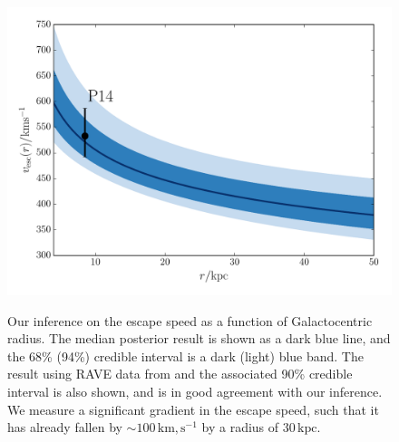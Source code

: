 \documentclass[useAMS,twocolumn,usenatbib]{mn2e}
\def\kpc{{\,\mathrm{kpc}}}
\def\km,s{{\,\mathrm{km,s^{-1}}}}
\begin{document}
\begin{figure}
\includegraphics[width=\columnwidth]{plots/vesc_posterior}\\
\caption{Our inference on the escape speed as a function of Galactocentric radius. 
The median posterior result is shown as a {} dark blue line, and the 68\% (94\%) credible interval is a dark (light) blue band. 
The result using RAVE data from \citet{Pi14} and the associated 90\% credible interval is also shown, and is in good agreement with our inference. 
We measure a significant gradient in the escape speed, such that it has already fallen by $\sim 100\km,s$ by  a radius of $30\kpc$.}
\label{fig:vesc_posterior}
\end{figure}
\end{document}
